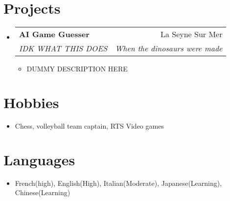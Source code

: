 \documentclass[letterpaper,11pt]{article}
\makeatletter
\newcommand{\resumeItem}[2]{
  \item\small{
    \textbf{#1}{#2 \vspace{-2pt}}
  }
}
\newcommand{\resumeSubheading}[4]{
  \vspace{-1pt}\item
    \begin{tabular*}{0.97\textwidth}[t]{l@{\extracolsep{\fill}}r}
      \textbf{#1} & #2 \\
      \textit{\small#3} & \textit{\small #4} \\
    \end{tabular*}\vspace{-5pt}
}
\newcommand{\resumeSubHeadingListStart}{\begin{itemize}[leftmargin=*]}
\newcommand{\resumeSubHeadingListEnd}{\end{itemize}}
\newcommand{\resumeItemListStart}{\begin{itemize}}
\newcommand{\resumeItemListEnd}{\end{itemize}\vspace{-5pt}}
\makeatother
\begin{document}
\section{Projects}
  \resumeSubHeadingListStart
	\resumeSubheading
	{AI Game Guesser}{La Seyne Sur Mer}
	{IDK WHAT THIS DOES}{When the dinosaurs were made}
		\resumeItemListStart
			\resumeItem{}
			{DUMMY DESCRIPTION HERE}
		\resumeItemListEnd
\resumeSubHeadingListEnd


\section{Hobbies}
	\resumeSubHeadingListStart
	\item{
	\textbf{}{Chess, volleyball team captain, RTS Video games}
	}
	\resumeSubHeadingListEnd
  
\section{Languages}
	\resumeSubHeadingListStart
	\item{
	\textbf{}{French(high), English(High), Italian(Moderate), Japanese(Learning), Chinese(Learning)}
	}
	\resumeSubHeadingListEnd
\end{document}
